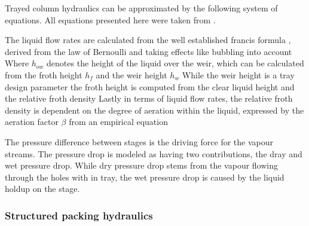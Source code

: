         Trayed column hydraulics can be approximated by the following system of equations.
        All equations presented here were taken from \cite{Lockett.2009}.

        The liquid flow rates are calculated from the well established francis formula ,
        derived from the law of Bernoulli and taking effects like bubbling into account
        Where $h_{ow}$ denotes the height of the liquid over the weir, which can be calculated from the
        froth height $h_f$ and the weir height $h_w$
        While the weir height is a tray design parameter the froth height is computed from the clear
        liquid height and the relative froth density
        Lastly in terms of liquid flow rates, the relative froth density is dependent on the
        degree of aeration within the liquid, expressed by the aeration factor $\beta$
        from an empirical equation

        The pressure difference between stages is the driving force for the vapour streams. The pressure drop
        is modeled as having two contributions, the dray and wet pressure drop. While dry pressure drop
        stems from the vapour flowing through the holes with in tray, the wet pressure drop is caused by the liquid
        holdup on the stage.

    \subsubsection{Structured packing hydraulics}
    \label{sec:mathpro:dynamic:strpackhyd}
        \begin{figure}
            
        \end{figure}

